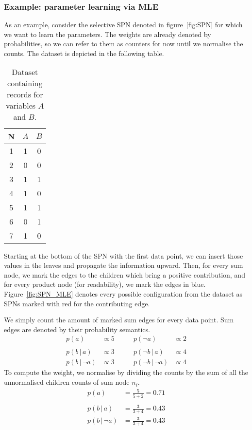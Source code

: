 \documentclass{article}
\newcommand{\giv}{\,|\,}
\begin{document}
\subsubsection{Example: parameter learning via MLE}

As an example, consider the selective SPN denoted in figure~\ref{fig:SPN} for which we want to learn the parameters. The weights are already denoted by probabilities, so we can refer to them as counters for now until we normalise the counts. The dataset is depicted in the following table.

\begin{table}[H]
    \centering
    \caption{Dataset containing records for variables $A$ and $B$.}\label{tab:spn}
    \vspace{5mm}
    \begin{tabular}{c|cc}
    \hline
        \textbf{N} & \textbf{$A$} & \textbf{$B$} \\ \hline 
        1 & 1 & 0 \\
        2 & 0 & 0 \\
        3 & 1 & 1 \\
        4 & 1 & 0 \\
        5 & 1 & 1 \\
        6 & 0 & 1 \\
        7 & 1 & 0 \\
        \hline
    \end{tabular}
\end{table}

\noindent Starting at the bottom of the SPN with the first data point, we can insert those values in the leaves and propagate the information upward. Then, for every sum node, we mark the edges to the children which bring a positive contribution, and for every product node (for readability), we mark the edges in blue. Figure~\ref{fig:SPN_MLE} denotes every possible configuration from the dataset as SPNs marked with red for the contributing edge. 

We simply count the amount of marked sum edges for every data point. Sum edges are denoted by their probability semantics.
\begin{align*}
    p(a) &\propto 5 \qquad& p(\neg a) &\propto 2\\\\
    p(b \giv a) &\propto 3 \qquad& p(\neg b \giv a) &\propto 4\\
    p(b \giv \neg a) &\propto 3 \qquad& p(\neg b \giv \neg a) &\propto 4
\end{align*}
\noindent To compute the weight, we normalise by dividing the counts by the sum of all the unnormalised children counts of sum node $n_i$.
\begin{align*}
    p(a) &= \frac{5}{5+2} = 0.71\\\\
    p(b \giv a) &= \frac{3}{3+4} = 0.43\\
    p(b \giv \neg a) &= \frac{3}{3+4} = 0.43
\end{align*}
\end{document}
